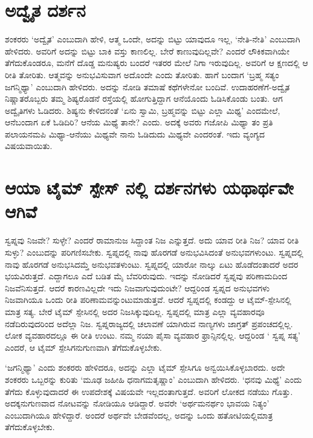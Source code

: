 \section*{ಅದ್ವೈತ ದರ್ಶನ}

ಶಂಕರರು `ಅದ್ವೈತ' ಎಂಬುದಾಗಿ ಹೇಳಿ, ಆತ್ಮ ಒಂದೇ, ಅದನ್ನು ಬಿಟ್ಟು ಯಾವುದೂ ಇಲ್ಲ, `ನೇತಿ-ನೇತಿ' ಎಂಬುದಾಗಿ ಹೇಳಿದರು. ಅವರಿಗೆ ಅದನ್ನು ಬಿಟ್ಟು ಬಾಕಿ ವಸ್ತು ಕಾಣಲಿಲ್ಲ. ಬೇರೆ ಕಾಣುವುದಿಲ್ಲವೇ? ಎಂದರೆ ಲೌಕಿಕವಾಗಿಯೇ ತೆಗೆದುಕೊಂಡರೂ, ಮನೆಗೆ ದೊಡ್ಡ ಮನುಷ್ಯರು ಬಂದರೆ ಇತರರ ಮೇಲೆ ನಿಗಾ ಇರುವುದಿಲ್ಲ. ಅವರಿಗೆ ಆ ಕ್ಷಣದಲ್ಲಿ ಆ ರೀತಿ ತೋರಿತು. ಆತ್ಮವನ್ನು ಅನುಭವಿಸುವಾಗ ಅದೊಂದೇ ಎಂದು ತೋರಿತು. ಹಾಗೆ ಬಂದಾಗ `ಬ್ರಹ್ಮ ಸತ್ಯಂ ಜಗನ್ಮಿಥ್ಯಾ' ಎಂಬುದಾಗಿ ಹೇಳಿದರು. ಅದನ್ನು ನೋಡಿ ತಮಾಷೆ ಕಥೆಗಳೇನೋ ಬಂದಿವೆ. ಉದಾಹರಣೆಗೆ-ಅದ್ವೈತ ನಿಷ್ಣಾತರೊಬ್ಬರು ತಮ್ಮ ಶಿಷ್ಯರೊಡನೆ ರಸ್ತೆಯಲ್ಲಿ ಹೋಗುತ್ತಿದ್ದಾಗ ಆನೆಯೊಂದು ಓಡಿಸಿಕೊಂಡು ಬಂತು. ಆಗ ಅದ್ವೈತಿಗಳು ಓಡಿದರು. ಶಿಷ್ಯನು ಕೇಳಿದನಂತೆ `ಏನು ಸ್ವಾಮಿ, ಬ್ರಹ್ಮವನ್ನು ಬಿಟ್ಟು ಎಲ್ಲಾ ಮಿಥ್ಯ' ಎಂದಮೇಲೆ, ಆನೆಬಂದಾಗ ಏಕೆ ಓಡಿದಿರಿ? ಆನೆಯ ಮಿಥ್ಯೆ ತಾನೇ? ಎಂದು. ಅದಕ್ಕೆ ಅವರು ಗಜೋಪಿ ಮಿಥ್ಯಾ ತಂ ಪ್ರತಿ ಪಲಾಯನಮಪಿ ಮಿಥ್ಯಾ-ಆನೆಯು ಮಿಥ್ಯವೇ ನಾನು ಓಡಿದುದು ಮಿಥ್ಯವೇ ಎಂದರಂತೆ. ಇದು ವ್ಯಂಗ್ಯದ ವಿಷಯವಾಯಿತು.

\section*{ಆಯಾ ಟೈಮ್ ಸ್ಪೇಸ್ ನಲ್ಲಿ ದರ್ಶನಗಳು ಯಥಾರ್ಥವೇ ಆಗಿವೆ}

ಸ್ವಪ್ನವು ನಿಜವೇ? ಸುಳ್ಳೇ? ಎಂದರೆ ರಾಮಾನುಜ ಸಿದ್ದಾಂತ ನಿಜ ಎನ್ನುತ್ತದೆ. ಅದು ಯಾವ ರೀತಿ ನಿಜ? ಯಾವ ರೀತಿ ಸುಳ್ಳು? ಎಂಬುದನ್ನು ಪರಿಗಣಿಸಬೇಕು. ಸ್ವಪ್ನದಲ್ಲಿ ನಾವು ಹೊರಗಡೆ ಅನುಭವಿಸಿದಂತೆ ಅನುಭವಗಳುಂಟು. ಸ್ವಪ್ನದಲ್ಲಿ ನಾವು ಹೊರಗಡೆ ಅನುಭಸಿದಮ್ತೆ ಅನುಭವತಳುಂಟು. ಸ್ವಪ್ನದಲ್ಲಿ ಯಾರೋ ನಾಲ್ಕು ಏಟು ಹೊಡೆದಂತಾದರೆ ಅದರ ಭಯವಿರುತ್ತದೆ. ಎದ್ದಾಗಲೂ ಎದೆ ಬಡಿತ ಮೈ ಬೆವರಿರುವುದು. ಇದನ್ನು ನೋಡಿದರೆ ಸ್ವಪ್ನವು ಪರಿಣಾಮದಿಂದ ನಿಜವೆನಿಸುತ್ತದೆ. ಆದರೆ ಕಾರಣವಿಲ್ಲದೇ ಇದು ನಿಜವಾಗುವುದುಂಟೇ? ಆದ್ದರಿಂಡ ಸ್ವಪ್ನದ ಅನುಭವಗಳು ನಿಜವಾಗಿಯೂ ಒಂದು ರೀತಿ ಪರಿಣಾಮವನ್ನುಂಟುಮಾಡುತ್ತವೆ. ಆದರೆ ಸ್ವಪ್ನದಲ್ಲಿ ಕಂಡದ್ದು ಆ ಟೈಮ್-ಸ್ಪೇಸಿನಲ್ಲಿ ಮಾತ್ರ ಸತ್ಯ. ಬೇರೆ ಟೈಮ್ ಸ್ಪೇಸಿನಲ್ಲಿ ಅದರ ನಿಜಸಿಕ್ಕುವುದಿಲ್ಲ. ಸ್ವಪ್ನದಲ್ಲಿ ಮಾತ್ರ ಎಲ್ಲಾ ವ್ಯವಹಾರವೂ ನಡೆದಿರುವುದರಿಂದ ಅದೆಲ್ಲಾ ನಿಜ. ಸ್ವಪ್ನರಾಜ್ಯದಲ್ಲಿ ಚಲಾವಣೆ ಯಾಗಿರುವ ನಾಣ್ಯಗಳು ಜಾಗ್ರತ್ ಪ್ರಪಂಚದಲ್ಲಿಲ್ಲ. ಲೋಕ ವ್ಯವಹಾರದಲ್ಲೂ ಈ ರೀತಿ ಉಂಟು. ನಮ್ಮ ನಯಾ ಪೈಸಾ ವ್ಯವಹಾರ ಫ್ರಾನ್ಸಿನಲ್ಲಿಲ್ಲ. ಆದ್ದರಿಂಡ ` ಸ್ವಪ್ನ ಸತ್ಯ' ಎಂದರೆ, ಆ ಟೈಮ್ ಸ್ಪೇಸಿಗನುಗುಣವಾಗಿ ತೆಗೆದುಕೊಳ್ಳಬೇಕು.

`ಜಗನ್ಮಿಥ್ಯಾ' ಎಂದು ಶಂಕರರು ಹೇಳಿದರೂ, ಅದನ್ನು ಎಲ್ಲಾ ಟೈಮ್ ಸ್ಪೇಸಿಗೂ ಅನ್ವಯಿಸಿಕೊಳ್ಳಬಾರದು. ಅದೇ ಶಂಕರರು ಒಬ್ಬರನ್ನು ಕುರಿತು `ಮೂಢ ಜಹೀಹಿ ಧನಾಗಮತೃಷ್ಣಾಂ' ಎಂಬುದಾಗಿ ಹೇಳಿದರು. `ಧನವು ಮಿಥ್ಯೆ' ಎಂದು ತೆಗೆದು ಕೊಳ್ಳುವುದಾದರೆ ಈ ಉಪದೇಶಕ್ಕೆ ವಿಷಯವೇ ಇಲ್ಲದಂತಾಗುತ್ತದೆ. ಅವರಿಗೆ ಲೋಕದ ನಡೆಯು ಗೊತ್ತು. ಅದಕ್ಕನುಗುಣವಾದ ನೋಟವನ್ನು ನೋಡಿಯೂ ಆಡಿದ್ದಾರೆ. ಅವರೇ `ಅರ್ಥಮನರ್ಥಂ ಭಾವಯ ನಿತ್ಯಂ' ಎಂಬುದಾಗಿಯೂ ಹೇಳಿದ್ದಾರೆ. ಅಂದರೆ ಅರ್ಥವೇ ಬೇಡವೆಂದಲ್ಲ, ಅದನ್ನು ಒಂದು ಹತೋಟಿಯಲ್ಲಿಮಾತ್ರ ತೆಗೆದುಕೊಳ್ಳಬೇಕು.

